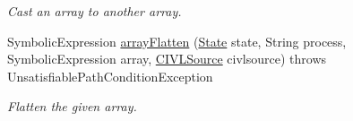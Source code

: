 \begin{DoxyCompactItemize}
\begin{DoxyCompactList}\small\item\em Cast an array to another array. \end{DoxyCompactList}\item 
Symbolic\+Expression \hyperlink{classedu_1_1udel_1_1cis_1_1vsl_1_1civl_1_1library_1_1common_1_1BaseLibraryEvaluator_a448fe3fe90273acd4b0588e5750060b9}{array\+Flatten} (\hyperlink{interfaceedu_1_1udel_1_1cis_1_1vsl_1_1civl_1_1state_1_1IF_1_1State}{State} state, String process, Symbolic\+Expression array, \hyperlink{interfaceedu_1_1udel_1_1cis_1_1vsl_1_1civl_1_1model_1_1IF_1_1CIVLSource}{C\+I\+V\+L\+Source} civlsource)  throws Unsatisfiable\+Path\+Condition\+Exception 
\begin{DoxyCompactList}\small\item\em Flatten the given array. \end{DoxyCompactList}\end{DoxyCompactItemize}
